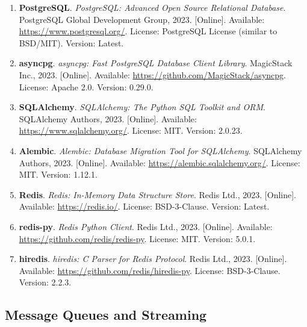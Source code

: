 \begin{enumerate}[resume]
    \item \textbf{PostgreSQL}. \textit{PostgreSQL: Advanced Open Source Relational Database}. 
    PostgreSQL Global Development Group, 2023. [Online]. Available: \url{https://www.postgresql.org/}. 
    License: PostgreSQL License (similar to BSD/MIT). Version: Latest.
    
    \item \textbf{asyncpg}. \textit{asyncpg: Fast PostgreSQL Database Client Library}. 
    MagicStack Inc., 2023. [Online]. Available: \url{https://github.com/MagicStack/asyncpg}. 
    License: Apache 2.0. Version: 0.29.0.
    
    \item \textbf{SQLAlchemy}. \textit{SQLAlchemy: The Python SQL Toolkit and ORM}. 
    SQLAlchemy Authors, 2023. [Online]. Available: \url{https://www.sqlalchemy.org/}. 
    License: MIT. Version: 2.0.23.
    
    \item \textbf{Alembic}. \textit{Alembic: Database Migration Tool for SQLAlchemy}. 
    SQLAlchemy Authors, 2023. [Online]. Available: \url{https://alembic.sqlalchemy.org/}. 
    License: MIT. Version: 1.12.1.
    
    \item \textbf{Redis}. \textit{Redis: In-Memory Data Structure Store}. 
    Redis Ltd., 2023. [Online]. Available: \url{https://redis.io/}. 
    License: BSD-3-Clause. Version: Latest.
    
    \item \textbf{redis-py}. \textit{Redis Python Client}. 
    Redis Ltd., 2023. [Online]. Available: \url{https://github.com/redis/redis-py}. 
    License: MIT. Version: 5.0.1.
    
    \item \textbf{hiredis}. \textit{hiredis: C Parser for Redis Protocol}. 
    Redis Ltd., 2023. [Online]. Available: \url{https://github.com/redis/hiredis-py}. 
    License: BSD-3-Clause. Version: 2.2.3.
\end{enumerate}

\subsection*{Message Queues and Streaming}


